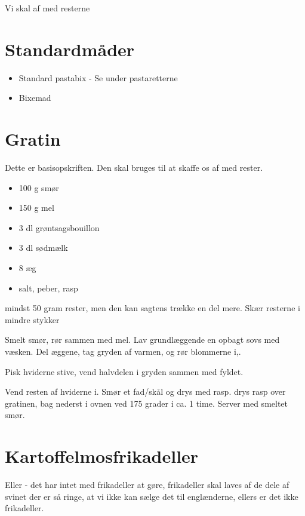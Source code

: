 \documentclass[
]{book}
\providecommand{\tightlist}{%
  \setlength{\itemsep}{0pt}\setlength{\parskip}{0pt}}
\begin{document}
Vi skal af med resterne

\section{Standardmåder}\label{standardmuxe5der}

\begin{itemize}
\tightlist
\item
  Standard pastabix - Se under pastaretterne
\item
  Bixemad
\end{itemize}

\section{Gratin}\label{gratin}

Dette er basisopskriften. Den skal bruges til at skaffe os af med rester.

\begin{itemize}
\tightlist
\item
  100 g smør
\item
  150 g mel
\item
  3 dl grøntsagsbouillon
\item
  3 dl sødmælk
\item
  8 æg
\item
  salt, peber, rasp
\end{itemize}

mindst 50 gram rester, men den kan sagtens trække en del mere.
Skær resterne i mindre stykker

Smelt smør, rør sammen med mel. Lav grundlæggende en opbagt
sovs med væsken.
Del æggene, tag gryden af varmen, og rør blommerne i,.

Pisk hviderne stive, vend halvdelen i gryden sammen med fyldet.

Vend resten af hviderne i. Smør et fad/skål
og drys med rasp. drys rasp over gratinen, bag nederst i ovnen
ved 175 grader i ca. 1 time. Server med smeltet smør.

\section{Kartoffelmosfrikadeller}\label{kartoffelmosfrikadeller}

Eller - det har intet med frikadeller at gøre, frikadeller skal laves af de dele af svinet der er så ringe, at vi ikke kan sælge det til englænderne, ellers er det ikke frikadeller.
\end{document}
